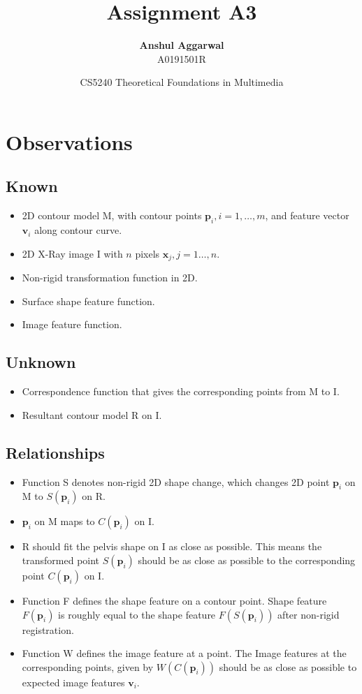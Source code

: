 \documentclass[12pt,a4paper]{article}
\title{Assignment A3}
\author{\textbf{Anshul Aggarwal}\\A0191501R}
\date{CS5240 Theoretical Foundations in Multimedia}
\begin{document}
\maketitle

\section{Observations}

\subsection{Known}

\begin{itemize}
    \item 2D contour model M, with contour points $\textbf{p}_i, i=1,\dots,m$, and feature vector $\textbf{v}_i$ along contour curve.
    \item 2D X-Ray image I with $n$ pixels $\textbf{x}_j,j=1\dots,n$.
    \item Non-rigid transformation function in 2D.
    \item Surface shape feature function.
    \item Image feature function.
\end{itemize}

\subsection{Unknown}

\begin{itemize}
    \item Correspondence function that gives the corresponding points from M to I.
    \item Resultant contour model R on I.
\end{itemize}

\subsection{Relationships}

\begin{itemize}
    \item Function S denotes non-rigid 2D shape change, which changes 2D point $\textbf{p}_i$ on M to $S(\textbf{p}_i)$ on R.
    \item $\textbf{p}_i$ on M maps to $C(\textbf{p}_i)$ on I. 
    \item R should fit the pelvis shape on I as close as possible. This means the transformed point $S(\textbf{p}_i)$ should be as close as possible to the corresponding point $C(\textbf{p}_i)$ on I.
    \item Function F defines the shape feature on a contour point. Shape feature $F(\textbf{p}_i)$ is roughly equal to the shape feature $F(S(\textbf{p}_i))$ after non-rigid registration.  
    \item Function W defines the image feature at a point. The Image features at the corresponding points, given by $W(C(\textbf{p}_i))$ should be as close as possible to expected image features $\textbf{v}_i$. 
\end{itemize}
\end{document}
